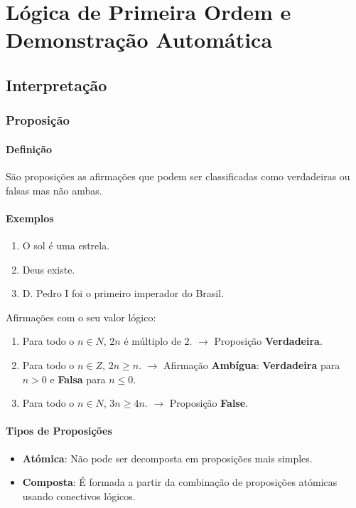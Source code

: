 \part{Lógica de Primeira Ordem e Demonstração Automática}
\label{part:1lpo}

\chapter{Interpretação}
\label{chap:1-interpretacao}

\section{Proposição}
\label{sec:1-interpretacao-proposicao}

\subsection{Definição}
São proposições as afirmações que podem ser classificadas como verdadeiras ou falsas mas não ambas.

\subsection{Exemplos}
\begin{enumerate}
    \item O sol é uma estrela.
    \item Deus existe.
    \item D. Pedro I foi o primeiro imperador do Brasil.
\end{enumerate}

Afirmações com o seu valor lógico:
\begin{enumerate}
    \item Para todo o $n \in N$, $2n$ é múltiplo de $2$. $\rightarrow$ Proposição \textbf{Verdadeira}.
    \item Para todo o $n \in Z$, $2n \geq n$. $\rightarrow$ Afirmação \textbf{Ambígua}: \textbf{Verdadeira} para $n > 0$ e \textbf{Falsa} para $n \leq 0$.
    \item Para todo o $n \in N$, $3n \geq 4n$. $\rightarrow$ Proposição \textbf{False}.
\end{enumerate}

\subsection{Tipos de Proposições}

\begin{itemize}
    \item \textbf{Atómica}: Não pode ser decomposta em proposições mais simples.
    \item \textbf{Composta}: É formada a partir da combinação de proposições atómicas usando conectivos lógicos.
\end{itemize}

